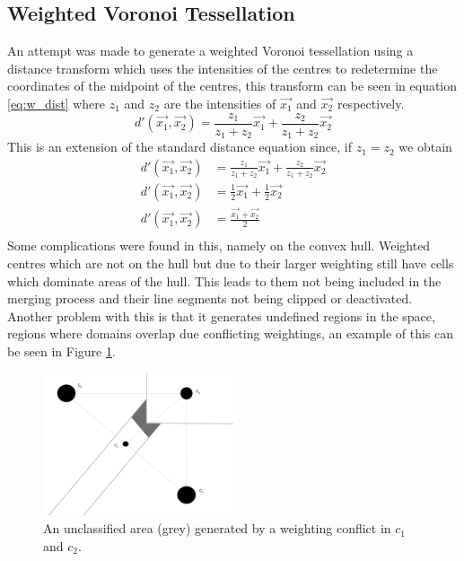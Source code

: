\subsection{Weighted Voronoi Tessellation}
An attempt was made to generate a weighted Voronoi tessellation using a distance transform which uses the intensities of the centres to redetermine the coordinates of the midpoint of the centres, this transform can be seen in equation \ref{eq:w_dist} where $z_1$ and $z_2$ are the intensities of $\vec{x_1}$ and $\vec{x_2}$ respectively.
\begin{equation}\label{eq:w_dist}
	d'(\vec{x_1},\vec{x_2}) = \frac{z_1}{z_1+z_2}\vec{x_1} + \frac{z_2}{z_1+z_2}\vec{x_2}
\end{equation}
This is an extension of the standard distance equation since, if $z_1=z_2$ we obtain
\begin{align*}
	d'(\vec{x_1},\vec{x_2}) &= \frac{z_1}{z_1+z_2}\vec{x_1} + \frac{z_2}{z_1+z_2}\vec{x_2} \\
	d'(\vec{x_1},\vec{x_2}) &= \frac{1}{2}\vec{x_1} + \frac{1}{2}\vec{x_2} \\ 
	d'(\vec{x_1},\vec{x_2}) &= \frac{\vec{x_1} + \vec{x_2}}{2} \\
\end{align*}
Some complications were found in this, namely on the convex hull. Weighted centres which are not on the hull but due to their larger weighting still have cells which dominate areas of the hull. This leads to them not being included in the merging process and their line segments not being clipped or deactivated. Another problem with this is that it generates undefined regions in the space, regions where domains overlap due conflicting weightings, an example of this can be seen in Figure \ref{fig:w_voronoi_issue}.
\begin{figure}[H]
\includegraphics[width=0.5\textwidth]{Images/weighting_problem.png}
\centering
\caption{An unclassified area (grey) generated by a weighting conflict in $c_1$ and $c_2$.}
\label{fig:w_voronoi_issue}
\end{figure}
